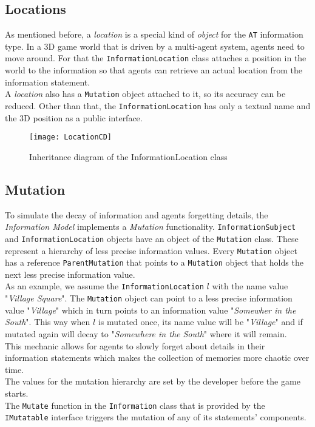 \subsection{Locations}
As mentioned before, a \textit{location} is a special kind of \textit{object} for the \verb|AT| information type. In a 3D game world that is driven by a multi-agent system, agents need to move around. For that the \verb|InformationLocation| class attaches a position in the world to the information so that agents can retrieve an actual location from the information statement.\\
A \textit{location} also has a \verb|Mutation| object attached to it, so its accuracy can be reduced. Other than that, the \verb|InformationLocation| has only a textual name and the 3D position as a public interface.
\begin{figure}
	\centering
	\texttt{[image: LocationCD]}
	\caption{Inheritance diagram of the InformationLocation class}
	\label{fig:locationCD}
\end{figure}
\subsection{Mutation}
\label{section:mutation}
To simulate the decay of information and agents forgetting details, the \textit{Information Model} implements a \textit{Mutation} functionality. \verb|InformationSubject| and \verb|InformationLocation| objects have an object of the \verb|Mutation| class. These represent a hierarchy of less precise information values. Every \verb|Mutation| object has a reference \verb|ParentMutation| that points to a \verb|Mutation| object that holds the next less precise information value.\\
As an example, we assume the \verb|InformationLocation| $l$ with the name value "\textit{Village Square}". The \verb|Mutation| object can point to a less precise information value "\textit{Village}" which in turn points to an information value "\textit{Somewher in the South}". This way when $l$ is mutated once, its name value will be "\textit{Village}" and if mutated again will decay to "\textit{Somewhere in the South}" where it will remain.\\
This mechanic allows for agents to slowly forget about details in their information statements which makes the collection of memories more chaotic over time.\\
The values for the mutation hierarchy are set by the developer before the game starts.\\
The \verb|Mutate| function in the \verb|Information| class that is provided by the \verb|IMutatable| interface triggers the mutation of any of its statements' components.
